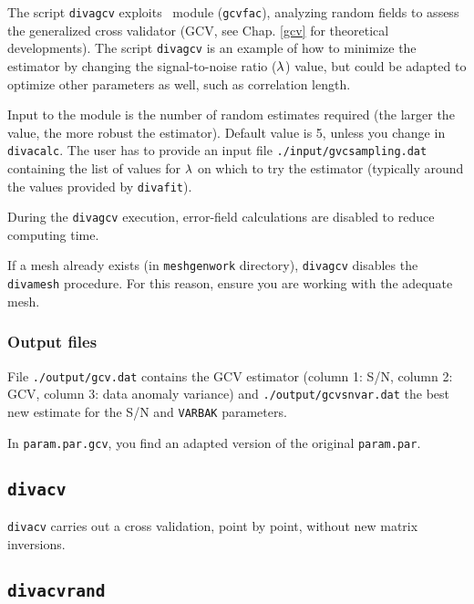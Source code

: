 The script \texttt{divagcv} exploits \diva\, module (\texttt{gcvfac}), analyzing random fields to assess the generalized cross validator (GCV, see Chap. \ref{gcv} for theoretical developments). The script \texttt{divagcv} is an example of how to minimize the estimator by changing the signal-to-noise ratio ($\lambda$) value, but could be adapted to optimize other parameters as well, such as correlation length.

Input to the module is the number of random estimates required (the larger the value, the more robust the estimator). Default value is 5, unless you change in \texttt{divacalc}. The user has to provide an input file \texttt{./input/gvcsampling.dat} containing the list of values for $\lambda$ on which to try the estimator (typically around the values provided by \texttt{divafit}).

During the \texttt{divagcv} execution, error-field calculations are disabled to reduce computing time. 

\btips
If a mesh already exists (in \texttt{meshgenwork} directory), \texttt{divagcv} disables the \texttt{divamesh} procedure. For this reason, ensure you are working with the adequate mesh.
\etips





\subsubsection{Output files}

File \texttt{./output/gcv.dat} contains the GCV estimator (column 1: S/N, column 2: GCV, column 3: data anomaly variance) and \texttt{./output/gcvsnvar.dat} the best new estimate for the S/N and \texttt{VARBAK} parameters.

In \texttt{param.par.gcv}, you find an adapted version of the original \texttt{param.par}.



\subsection{\texttt{divacv}}

\texttt{divacv} carries out a cross validation, point by point, without new matrix inversions. 

\subsection{\texttt{divacvrand}}


